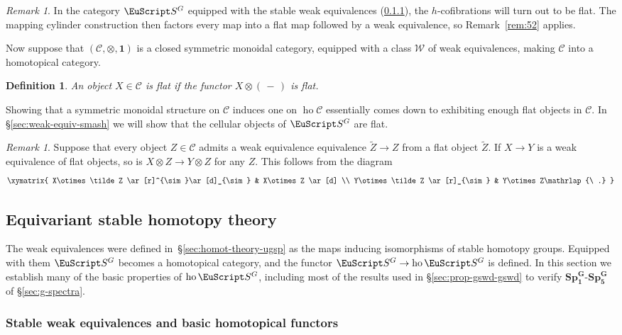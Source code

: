\documentclass{amsart}
\newtheorem{definition}[equation]{Definition}
\newenvironment{defin}{\begin{definition}\rm}{\end{definition}}
\newtheorem{rem}[equation]{Remark}
\theoremstyle{definition}
\newtheorem{defin}[equation]{Definition}
\theoremstyle{remark}
\newtheorem{rem}[equation]{Remark}
\newcommand{\slot}{\,-\,}
\newcommand{\spectra}{\EuScript S}
\DeclareMathOperator{\ho}{ho}
\newcommand{\ugspectra}[1]{\spectra^{#1}}
\newcommand{\cat}[1]{{\mathcal #1}}
\newcommand{\one}{\mathbf{1}}
\newcommand{\gswdes}[1]{\mathbf{Sp^{G}_{#1}}}
\begin{document}
\begin{rem}
\label{rem:7} In the category $\ugspectra{G}$ equipped with the stable
weak equivalences (\ref{sec-copied:homot-theory-ugsp}), the
$h$-cofibrations will turn out to be flat.  The mapping cylinder
construction then factors every map into a flat map followed by a weak
equivalence, so Remark~\ref{rem:52} applies.
\end{rem}

Now suppose that $(\cat C,\otimes, \one)$ is a closed symmetric
monoidal category, equipped with a class $\mathcal W$ of weak
equivalences, making $\cat C$ into a homotopical category.

\begin{defin}
\label{def:59}
An object $X\in \cat C$ is {\em flat} if the functor $X\otimes
(\slot)$ is flat.   
\end{defin}

Showing that a symmetric monoidal structure on $\cat C$ induces one on
$\ho\cat C$ essentially comes down to exhibiting enough flat objects
in $\cat C$.  In \S\ref{sec:weak-equiv-smash} we will show that the
cellular objects of $\ugspectra{G}$ are flat.

\begin{rem}
\label{rem:67} Suppose that every object $Z\in\cat C$ admits a weak
equivalence equivalence $\tilde Z\to Z$ from a flat object $\tilde Z$.
If $X\to Y$ is a weak equivalence of flat objects, so is $X\otimes Z\to
Y\otimes Z$ for any $Z$.  This follows from the diagram
\[
\xymatrix{
X\otimes \tilde Z  \ar[r]^{\sim}\ar[d]_{\sim}  & X\otimes Z
\ar[d] \\
Y\otimes \tilde Z  \ar[r]_{\sim}        & Y\otimes Z\mathrlap{\ .}
}
\]
\end{rem}
\subsection{Equivariant stable homotopy theory}
\label{sec:equiv-stable-homot} 

The weak equivalences were defined
in~\S\ref{sec:homot-theory-ugsp} as the maps inducing isomorphisms of
stable homotopy groups.  Equipped with them $\ugspectra{G}$ becomes a
homotopical category, and the functor $\ugspectra{G}\to
\ho\ugspectra{G}$ is defined.  In this section we establish many of
the basic properties of $\ho\ugspectra{G}$, including most of the
results used in \S\ref{sec:prop-gswd-gswd} to verify
$\gswdes{1}$-$\gswdes{5}$ of \S\ref{sec:g-spectra}.  

\subsubsection{Stable weak equivalences and basic homotopical functors}
\label{sec-copied:homot-theory-ugsp} 
\end{document}
